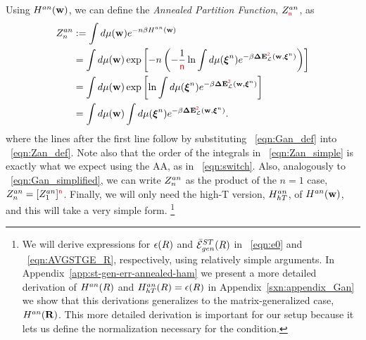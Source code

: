 Using $H^{an}({\mathbf{w}})$, we can define the \emph{Annealed Partition Function}, $Z^{an}_{{\color{red}\sf{n}}}$, as
\begin{align}
  \label{eqn:Zan_def}
  Z^{an}_{n} 
  &:=  \int d\mu({\mathbf{w}}) e^{-n\beta H^{an}({\mathbf{w}})} \\ \nonumber
  &=\int d\mu({\mathbf{w}}) \exp\left[-n \left(- \frac{1}{{\color{red}\sf{n}}}\ln  \int d\mu(\boldsymbol{\xi}^{n})e^{-\beta\mathbf{\Delta {E}}^{{\color{red}\sf{2}}}_{\mathcal{L}}(\mathbf{w}, \boldsymbol{\xi}^{n})}\right)\right] \\ \nonumber
  &=  \int d\mu({\mathbf{w}}) \exp\left[\ln  \int d\mu(\boldsymbol{\xi}^{n})e^{-\beta\mathbf{\Delta {E}}^{{\color{red}\sf{2}}}_{\mathcal{L}}(\mathbf{w}, \boldsymbol{\xi}^{n})}\right] \\ 
  \label{eqn:Zan_simple}
  &=  \int d\mu({\mathbf{w}})  \int d\mu(\boldsymbol{\xi}^{n})e^{-\beta\mathbf{\Delta {E}}^{{\color{red}\sf{2}}}_{\mathcal{L}}(\mathbf{w}, \boldsymbol{\xi}^{n})} .
\end{align}
where the lines after the first line follow by substituting \EQN~\ref{eqn:Gan_def} into \EQN~\ref{eqn:Zan_def}.
Note also that the order of the integrals in \EQN~\ref{eqn:Zan_simple} is exactly what we expect using the AA, as in \EQN~\ref{eqn:switch}.
Also, analogously to \EQN~\ref{eqn:Gan_simplified}, we can write $Z^{an}_{n}$ as the product of the $n=1$ case, $Z^{an}_{n}=[Z^{an}_{1}]^{{\color{red}\sf{n}}}$.
Finally, we will only need the high-T version, $H^{an}_{hT}$, of $H^{an}({\mathbf{w}})$, and this will take a very simple form.
\footnote{We will derive expressions for $\epsilon(R)$ and $\bar{\mathcal{E}}^{ST}_{gen}(R)$ in \EQN~\ref{eqn:e0} and \EQN~\ref{eqn:AVGSTGE_R}, respectively, using relatively simple arguments.
In Appendix~\ref{app:st-gen-err-annealed-ham} we present
a more detailed derivation of $H^{an}(R)$ and $H^{an}_{hT}(R)=\epsilon(R)$
in Appendix~\ref{sxn:appendix_Gan} we show that this derivations generalizes to the matrix-generalized case, $H^{an}(\mathbf{R})$.
This more detailed derivation is important for our \SETOL setup because it lets us define the normalization
necessary for the \TRACELOG condition.
}



